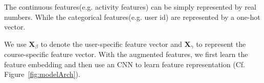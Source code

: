  The continuous features(e.g. activity features) can be simply represented by real numbers. While the categorical features(e.g. user id) are represented by a one-hot vector.
 

We use $\mathbf{X}_\beta$
to denote the user-specific feature vector and $\mathbf{X}_\gamma$
to represent the course-specific feature vector. 
With the augmented features, we first learn the feature embedding and then use an CNN to learn feature representation (Cf. Figure~\ref{fig:modelArch}).


